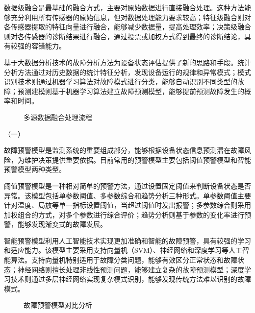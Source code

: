 数据级融合是最基础的融合方式，主要对原始数据进行直接融合处理。这种方法能够充分利用所有传感器的原始信息，但对数据处理能力要求较高；特征级融合则对各传感器提取的特征向量进行融合，能够减少数据量，提高处理效率；决策级融合则对各传感器的诊断结果进行融合，通过投票或加权方式得到最终的诊断结论，具有较强的容错能力。

基于大数据分析技术的故障分析方法为设备状态评估提供了新的思路和手段。统计分析方法通过对历史数据的统计特征分析，发现设备运行的规律和异常模式；模式识别技术则通过机器学习算法对故障模式进行分类，能够自动识别不同类型的故障；预测建模则基于机器学习算法建立故障预测模型，能够提前预测故障发生的概率和时间。

\begin{figure}[h]
\centering
\caption{多源数据融合处理流程}
\label{fig:data_fusion_process}
\end{figure}

（一）

故障预警模型是监测系统的重要组成部分，能够根据设备状态信息预测潜在故障风险，为维护决策提供重要依据。目前常用的预警模型主要包括阈值预警模型和智能预警模型两种类型。

阈值预警模型是一种相对简单的预警方法，通过设置固定阈值来判断设备状态是否异常。该模型包括单参数阈值、多参数综合和趋势分析三种形式。单参数阈值主要针对温度、局放等单一指标设置阈值，当超过阈值时发出报警；多参数综合则采用加权组合的方式，对多个参数进行综合评价；趋势分析则基于参数的变化率进行预警，能够发现渐变式的故障发展。

智能预警模型利用人工智能技术实现更加准确和智能的故障预警，具有较强的学习和适应能力。该模型主要采用支持向量机（SVM）、神经网络和深度学习等人工智能算法。支持向量机特别适用于故障分类问题，能够有效区分正常状态和故障状态；神经网络则擅长处理非线性预测问题，能够建立复杂的故障预测模型；深度学习技术则通过多层神经网络实现复杂模式识别，能够发现传统方法难以识别的故障模式。

\begin{figure}[h]
\centering
\caption{故障预警模型对比分析}
\label{fig:warning_model_comparison}
\end{figure}